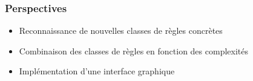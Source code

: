 

\begin{frame}
	\frametitle{Perspectives}
	\begin{itemize}
		\item Reconnaissance de nouvelles classes de règles concrètes
		\item Combinaison des classes de règles en fonction des complexités
		\item Implémentation d'une interface graphique
	\end{itemize}
\end{frame}


